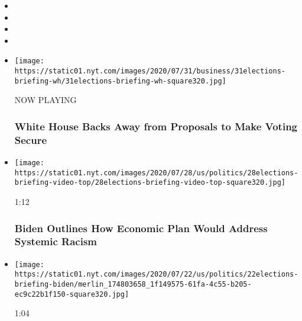 \begin{itemize}
\item
\item
\item
\item
\end{itemize}

\begin{itemize}
\item
  \texttt{[image: https://static01.nyt.com/images/2020/07/31/business/31elections-briefing-wh/31elections-briefing-wh-square320.jpg]}

  NOW PLAYING

  \hypertarget{white-house-backs-away-from-proposals-to-make-voting-secure-2}{%
  \subsubsection{White House Backs Away from Proposals to Make Voting
  Secure}\label{white-house-backs-away-from-proposals-to-make-voting-secure-2}}
\item
  \href{https://www.nytimes.com/video/us/politics/100000007260487/watch-live-biden-delivers-speech-on-systemic-racism.html?action=click\&module=video-series-bar\&region=header\&pgtype=Article\&playlistId=video/2020-Elections}{}

  \texttt{[image: https://static01.nyt.com/images/2020/07/28/us/politics/28elections-briefing-video-top/28elections-briefing-video-top-square320.jpg]}

  1:12

  \hypertarget{biden-outlines-how-economic-plan-would-address-systemic-racism}{%
  \subsubsection{Biden Outlines How Economic Plan Would Address Systemic
  Racism}\label{biden-outlines-how-economic-plan-would-address-systemic-racism}}
\item
  \href{https://www.nytimes.com/video/us/100000007251300/biden-trump-racist-divide-america.html?action=click\&module=video-series-bar\&region=header\&pgtype=Article\&playlistId=video/2020-Elections}{}

  \texttt{[image: https://static01.nyt.com/images/2020/07/22/us/politics/22elections-briefing-biden/merlin\_174803658\_1f149575-61fa-4c55-b205-ec9c22b1f150-square320.jpg]}

  1:04

  \hypertarget{biden-says-trump-is-spreading-racism-and-dividing-america}{%
}
\end{itemize}
